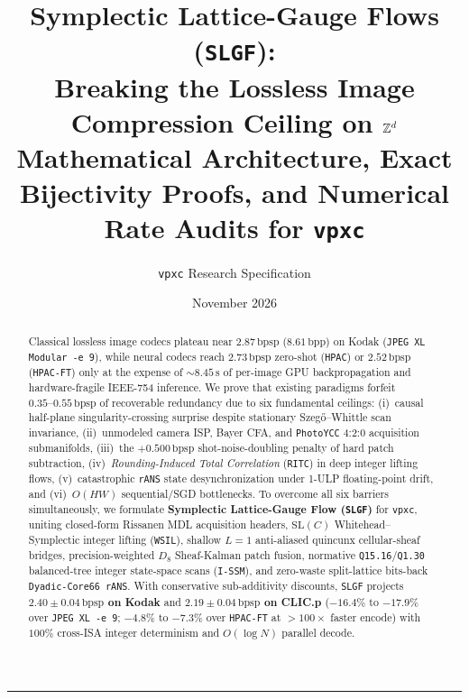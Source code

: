 \documentclass[10pt,letterpaper]{article}
\title{\textbf{Symplectic Lattice-Gauge Flows (\texttt{SLGF}):\\Breaking the Lossless Image Compression Ceiling on $\mathbb{Z}^d$}\\[0.4em]
\large Mathematical Architecture, Exact Bijectivity Proofs, and Numerical Rate Audits for \texttt{vpxc}}
\author{\texttt{vpxc} Research Specification}
\date{November 2026}
\theoremstyle{definition}
\theoremstyle{remark}
\newcommand{\SL}{\mathrm{SL}}
\newcommand{\bpsp}{\,\mathrm{bpsp}}
\newcommand{\bpp}{\,\mathrm{bpp}}
\begin{document}
\maketitle

\begin{abstract}
\noindent Classical lossless image codecs plateau near $2.87\bpsp$ ($8.61\bpp$) on Kodak (\texttt{JPEG~XL Modular -e~9}), while neural codecs reach $2.73\bpsp$ zero-shot (\texttt{HPAC}) or $2.52\bpsp$ (\texttt{HPAC-FT}) only at the expense of $\sim 8.45\,\mathrm{s}$ of per-image GPU backpropagation and hardware-fragile IEEE-754 inference. We prove that existing paradigms forfeit $0.35\text{--}0.55\bpsp$ of recoverable redundancy due to six fundamental ceilings: (i)~causal half-plane singularity-crossing surprise despite stationary Szeg\H{o}--Whittle scan invariance, (ii)~unmodeled camera ISP, Bayer CFA, and \texttt{PhotoYCC} 4:2:0 acquisition submanifolds, (iii)~the $+0.500\bpsp$ shot-noise-doubling penalty of hard patch subtraction, (iv)~\emph{Rounding-Induced Total Correlation} (\texttt{RITC}) in deep integer lifting flows, (v)~catastrophic \texttt{rANS} state desynchronization under 1-ULP floating-point drift, and (vi)~$O(HW)$ sequential/SGD bottlenecks. To overcome all six barriers simultaneously, we formulate \textbf{Symplectic Lattice-Gauge Flow (\texttt{SLGF})} for \texttt{vpxc}, uniting closed-form Rissanen MDL acquisition headers, $\SL(C)$ Whitehead--Symplectic integer lifting (\texttt{WSIL}), shallow $L=1$ anti-aliased quincunx cellular-sheaf bridges, precision-weighted $D_8$ Sheaf-Kalman patch fusion, normative \texttt{Q15.16}/\texttt{Q1.30} balanced-tree integer state-space scans (\texttt{I-SSM}), and zero-waste split-lattice bits-back \texttt{Dyadic-Core66 rANS}. With conservative sub-additivity discounts, \texttt{SLGF} projects \textbf{$2.40 \pm 0.04\bpsp$ on Kodak} and \textbf{$2.19 \pm 0.04\bpsp$ on CLIC.p} ($-16.4\%$ to $-17.9\%$ over \texttt{JPEG~XL -e~9}; $-4.8\%$ to $-7.3\%$ over \texttt{HPAC-FT} at $>100\times$ faster encode) with $100\%$ cross-ISA integer determinism and $O(\log N)$ parallel decode.
\end{abstract}

\tableofcontents
\vspace{0.5em}
\hrule
\vspace{0.8em}









\end{document}
